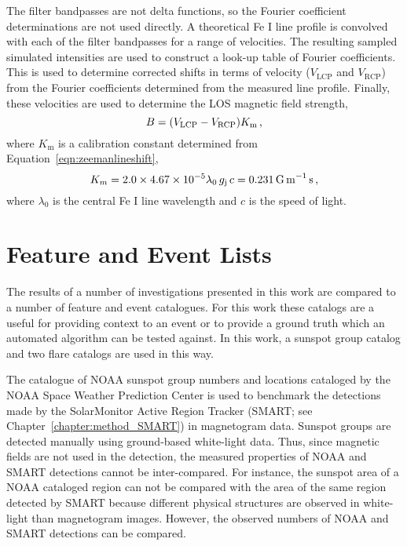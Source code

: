 The filter bandpasses are not delta functions, so the Fourier coefficient determinations are not used directly. A theoretical Fe I line profile is convolved with each of the filter bandpasses for a range of velocities. The resulting sampled simulated intensities are used to construct a look-up table of Fourier coefficients. This is used to determine corrected shifts in terms of velocity ($V_{\mathrm{LCP}}$ and $V_{\mathrm{RCP}}$) from the Fourier coefficients determined from the measured line profile. Finally, these velocities are used to determine the \gls{LOS} magnetic field strength,
\begin{equation}\label{eqn:hmilosmag}
B=(V_{\mathrm{LCP}}-V_{\mathrm{RCP}})K_\mathrm{m} \mbox{\,,}
\end{equation}
where $K_\mathrm{m}$ is a calibration constant determined from Equation~\ref{eqn:zeemanlineshift},
\begin{equation}
K_{m}=2.0\times 4.67\times 10^{-5} \lambda_{0}\,g_\mathrm{j}\,c = 0.231 \mathrm{\,G\,m}^{-1}\mathrm{\,s} \mbox{\,,} 
\end{equation}
where $\lambda_{0}$ is the central Fe I line wavelength and $c$ is the speed of light.


\section{Feature and Event Lists}\label{sect:eventlists}

The results of a number of investigations presented in this work are compared to a number of feature and event catalogues. For this work these catalogs are a useful for providing context to an event or to provide a ground truth which an automated algorithm can be tested against. In this work, a sunspot group catalog and two flare catalogs are used in this way.

The catalogue of \gls{NOAA} sunspot group numbers and locations cataloged by the \gls{NOAA} Space Weather Prediction Center is used to benchmark the detections made by the SolarMonitor Active Region Tracker (SMART; see Chapter~\ref{chapter:method_SMART}) in magnetogram data. Sunspot groups are detected manually using ground-based white-light data. Thus, since magnetic fields are not used in the detection, the measured properties of \gls{NOAA} and SMART detections cannot be inter-compared. For instance, the sunspot area of a NOAA cataloged region can not be compared with the area of the same region detected by SMART because different physical structures are observed in white-light than magnetogram images.
However, the observed numbers of \gls{NOAA} and SMART detections can be compared.

